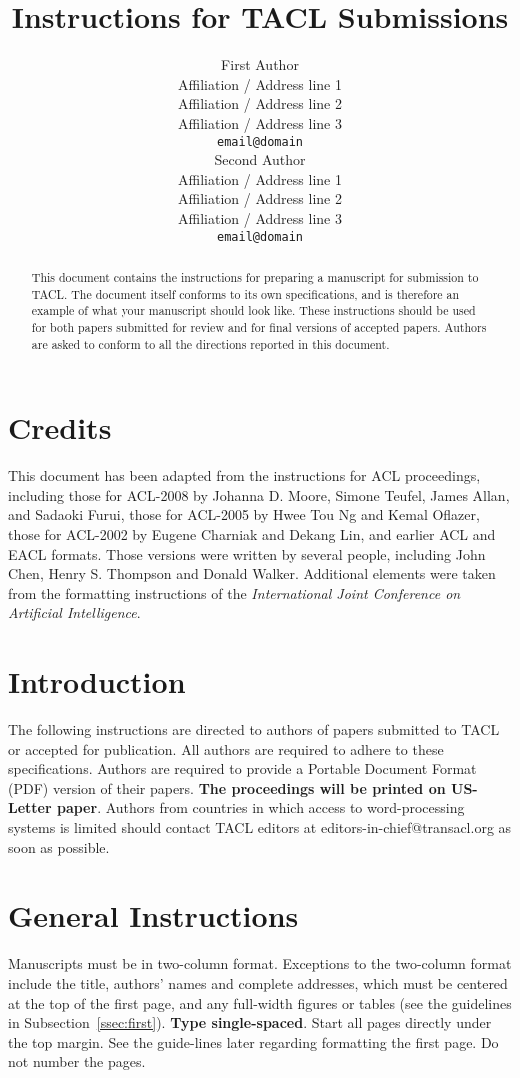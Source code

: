 \documentclass[11pt,letterpaper]{article}
\title{Instructions for TACL Submissions}
\author{First Author \\
  Affiliation / Address line 1 \\
  Affiliation / Address line 2 \\
  Affiliation / Address line 3 \\
  {\tt email@domain} \\\And
  Second Author \\
  Affiliation / Address line 1 \\
  Affiliation / Address line 2 \\
  Affiliation / Address line 3 \\
  {\tt email@domain} \\}
\date{}
\begin{document}
\maketitle
\begin{abstract}
  This document contains the instructions for preparing a manuscript for submission to TACL. The document itself conforms to its own specifications, and is therefore an example of what your manuscript should look like. These instructions should be used for both papers submitted for review and for final versions of accepted papers. Authors are asked to conform to all the directions reported in this document.
\end{abstract}

\section{Credits}

This document has been adapted from the instructions for ACL proceedings, including those for ACL-2008 by Johanna D. Moore, Simone Teufel, James Allan, and Sadaoki Furui, those for ACL-2005 by Hwee Tou Ng and Kemal Oflazer, those for ACL-2002 by Eugene Charniak and Dekang Lin, and earlier ACL and EACL formats. Those versions were written by several people, including John Chen, Henry S. Thompson and Donald Walker. Additional elements were taken from the formatting instructions of the {\em International Joint Conference on Artificial Intelligence}.

\section{Introduction}

The following instructions are directed to authors of papers submitted to TACL or accepted for publication. All authors are required to adhere to these specifications. Authors are required to provide a Portable Document Format (PDF)
version of their papers. \textbf{The proceedings will be printed on
  US-Letter paper}. Authors from countries in which access to
word-processing systems is limited should contact TACL editors at editors-in-chief@transacl.org as soon as possible.


\section{General Instructions}

Manuscripts must be in two-column format. Exceptions to the two-column format include the title,
authors' names and complete addresses, which must be centered at the top of the first page,
and any full-width figures or tables (see the guidelines in Subsection~\ref{ssec:first}). {\bf Type single-spaced}.
Start all pages directly under the top margin. See the guide-lines later regarding formatting the first page. Do not number the pages.
\end{document}
